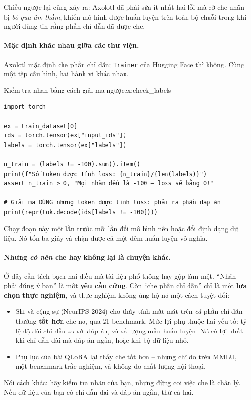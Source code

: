 Chiều ngược lại cũng xảy ra: Axolotl đã phải sửa ít nhất hai lỗi mà cờ che nhãn bị \emph{bỏ qua âm thầm}, khiến mô hình được huấn luyện trên toàn bộ chuỗi trong khi người dùng tin rằng phần chỉ dẫn đã được che.

\paragraph{Mặc định khác nhau giữa các thư viện.} Axolotl mặc định che phần chỉ dẫn; \texttt{Trainer} của Hugging Face thì không. Cùng một tệp cấu hình, hai hành vi khác nhau.

\begin{example}{Kiểm tra nhãn bằng cách giải mã ngược}{ex:check_labels}
\begin{verbatim}
import torch

ex = train_dataset[0]
ids = torch.tensor(ex["input_ids"])
labels = torch.tensor(ex["labels"])

n_train = (labels != -100).sum().item()
print(f"Số token được tính loss: {n_train}/{len(labels)}")
assert n_train > 0, "Mọi nhãn đều là -100 — loss sẽ bằng 0!"

# Giải mã ĐÚNG những token được tính loss: phải ra phần đáp án
print(repr(tok.decode(ids[labels != -100])))
\end{verbatim}
Chạy đoạn này một lần trước mỗi lần đổi mô hình nền hoặc đổi định dạng dữ liệu. Nó tốn ba giây và chặn được cả một đêm huấn luyện vô nghĩa.
\end{example}

\paragraph{Nhưng \emph{có nên} che hay không lại là chuyện khác.} Ở đây cần tách bạch hai điều mà tài liệu phổ thông hay gộp làm một. “Nhãn phải đúng ý bạn” là một \textbf{yêu cầu cứng}. Còn “che phần chỉ dẫn” chỉ là một \textbf{lựa chọn thực nghiệm}, và thực nghiệm không ủng hộ nó một cách tuyệt đối:

\begin{itemize}
	\item Shi và cộng sự \cite{shi2024instruction} (NeurIPS 2024) cho thấy tính mất mát trên \emph{cả} phần chỉ dẫn thường \textbf{tốt hơn} che nó, qua 21 benchmark. Mức lợi phụ thuộc hai yếu tố: tỷ lệ độ dài chỉ dẫn so với đáp án, và số lượng mẫu huấn luyện. Nó có lợi nhất khi chỉ dẫn dài mà đáp án ngắn, hoặc khi bộ dữ liệu nhỏ.
	\item Phụ lục của bài QLoRA \cite{dettmers2023qlora} lại thấy che tốt hơn -- nhưng chỉ đo trên MMLU, một benchmark trắc nghiệm, và không đo chất lượng hội thoại.
\end{itemize}
Nói cách khác: hãy kiểm tra nhãn của bạn, nhưng đừng coi việc che là chân lý. Nếu dữ liệu của bạn có chỉ dẫn dài và đáp án ngắn, thử cả hai.

